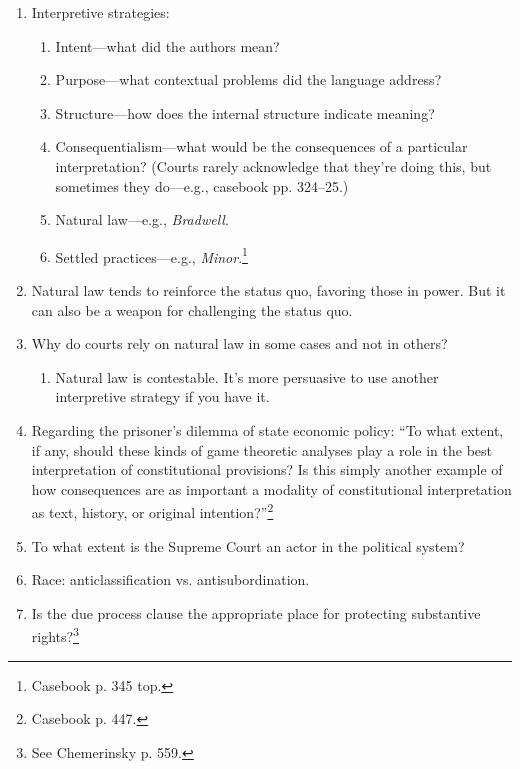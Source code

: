 \begin{enumerate}
\begin{enumerate}
    \end{enumerate}
    \item Interpretive strategies:
    \begin{enumerate}
        \item Intent---what did the authors mean?
        \item Purpose---what contextual problems did the language address?
        \item Structure---how does the internal structure indicate meaning?
        \item Consequentialism---what would be the consequences of a 
        particular interpretation? (Courts rarely acknowledge that they're 
        doing this, but sometimes they do---e.g., casebook pp. 324--25.)
        \item Natural law---e.g., \emph{Bradwell}.
        \item Settled practices---e.g., \emph{Minor}.\footnote{Casebook p. 345 
        top.}
    \end{enumerate}
    \item Natural law tends to reinforce the status quo, favoring those in 
    power. But it can also be a weapon for challenging the status quo.
    \item Why do courts rely on natural law in some cases and not in others?
    \begin{enumerate}
        \item Natural law is contestable. It's more persuasive to use another 
        interpretive strategy if you have it.
    \end{enumerate}
    \item Regarding the prisoner's dilemma of state economic policy: ``To what 
    extent, if any, should these kinds of game theoretic analyses play a role 
    in the best interpretation of constitutional provisions? Is this simply 
    another example of how consequences are as important a modality of 
    constitutional interpretation as text, history, or original 
    intention?''\footnote{Casebook p. 447.}
    \item To what extent is the Supreme Court an actor in the political 
    system?
    \item Race: anticlassification vs. antisubordination.
    \item Is the due process clause the appropriate place for protecting 
    substantive rights?\footnote{See Chemerinsky p. 559.}
\end{enumerate}

